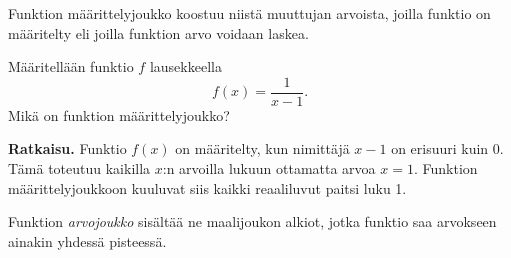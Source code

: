 Funktion määrittelyjoukko koostuu niistä muuttujan arvoista, joilla
funktio on määritelty eli joilla funktion arvo voidaan laskea.

\begin{esimerkki}
Määritellään funktio $f$ lausekkeella
\[
f(x) = \frac{1}{x-1}.
\]
Mikä on funktion määrittelyjoukko?

\textbf{Ratkaisu.}
Funktio $f(x)$ on määritelty, kun nimittäjä $x-1$ on erisuuri
kuin 0. Tämä toteutuu kaikilla $x$:n arvoilla lukuun ottamatta
arvoa $x = 1$. Funktion määrittelyjoukkoon kuuluvat siis
kaikki reaaliluvut paitsi luku 1.
\end{esimerkki}

Funktion \emph{arvojoukko} sisältää ne maalijoukon alkiot,
jotka funktio saa arvokseen ainakin yhdessä pisteessä.

